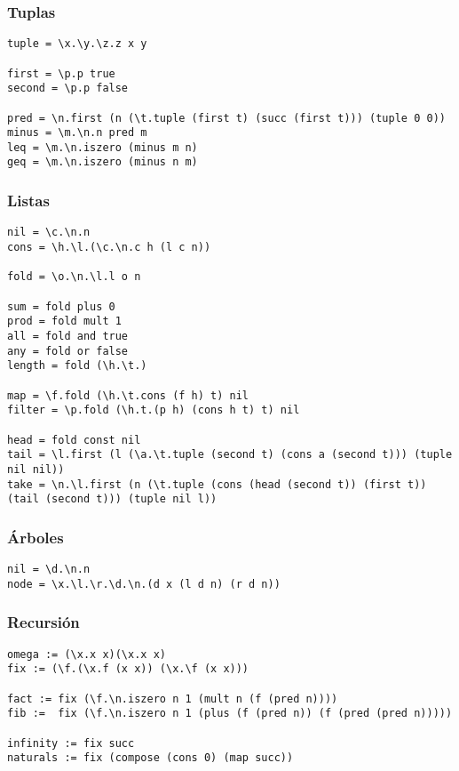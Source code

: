 \documentclass[11pt]{article}
\begin{document}
\subsubsection*{Tuplas}
\label{sec-14-5-4}
\begin{verbatim}
tuple = \x.\y.\z.z x y

first = \p.p true
second = \p.p false

pred = \n.first (n (\t.tuple (first t) (succ (first t))) (tuple 0 0))
minus = \m.\n.n pred m
leq = \m.\n.iszero (minus m n)
geq = \m.\n.iszero (minus n m)
\end{verbatim}

\subsubsection*{Listas}
\label{sec-14-5-5}
\begin{verbatim}
nil = \c.\n.n
cons = \h.\l.(\c.\n.c h (l c n))

fold = \o.\n.\l.l o n

sum = fold plus 0
prod = fold mult 1
all = fold and true
any = fold or false
length = fold (\h.\t.)

map = \f.fold (\h.\t.cons (f h) t) nil
filter = \p.fold (\h.t.(p h) (cons h t) t) nil

head = fold const nil
tail = \l.first (l (\a.\t.tuple (second t) (cons a (second t))) (tuple nil nil))
take = \n.\l.first (n (\t.tuple (cons (head (second t)) (first t)) (tail (second t))) (tuple nil l))
\end{verbatim}

\subsubsection*{Árboles}
\label{sec-14-5-6}
\begin{verbatim}
nil = \d.\n.n
node = \x.\l.\r.\d.\n.(d x (l d n) (r d n))
\end{verbatim}

\subsubsection*{Recursión}
\label{sec-14-5-7}
\begin{verbatim}
omega := (\x.x x)(\x.x x)
fix := (\f.(\x.f (x x)) (\x.\f (x x)))

fact := fix (\f.\n.iszero n 1 (mult n (f (pred n))))
fib :=  fix (\f.\n.iszero n 1 (plus (f (pred n)) (f (pred (pred n)))))

infinity := fix succ
naturals := fix (compose (cons 0) (map succ))
\end{verbatim}
\end{document}
